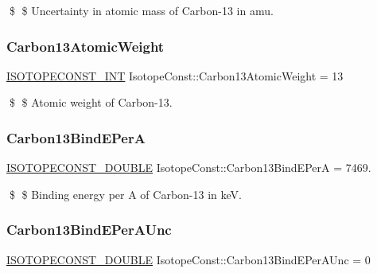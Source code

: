 \$ \$ Uncertainty in atomic mass of Carbon-\/13 in amu. \mbox{\label{group___isotope_const-_carbon-_c13_gac14d76d55767d91128913edcf63fb947}} 
\subsubsection{\texorpdfstring{Carbon13\+Atomic\+Weight}{Carbon13AtomicWeight}}
{\footnotesize\ttfamily \mbox{\hyperlink{group___isotope_const-_macros_ga5f18360b3e99483a35c32d789e62621c}{I\+S\+O\+T\+O\+P\+E\+C\+O\+N\+S\+T\+\_\+\+I\+NT}} Isotope\+Const\+::\+Carbon13\+Atomic\+Weight = 13}

\$ \$ Atomic weight of Carbon-\/13. \mbox{\label{group___isotope_const-_carbon-_c13_gaf77808284501b17d7325ed89c210363d}} 
\subsubsection{\texorpdfstring{Carbon13\+Bind\+E\+PerA}{Carbon13BindEPerA}}
{\footnotesize\ttfamily \mbox{\hyperlink{group___isotope_const-_macros_ga8f45a7272ce02c0b4c65c44636ed719a}{I\+S\+O\+T\+O\+P\+E\+C\+O\+N\+S\+T\+\_\+\+D\+O\+U\+B\+LE}} Isotope\+Const\+::\+Carbon13\+Bind\+E\+PerA = 7469.}

\$ \$ Binding energy per A of Carbon-\/13 in keV. \mbox{\label{group___isotope_const-_carbon-_c13_ga95d33cc96a0c48bdbf17601012fe45cb}} 
\subsubsection{\texorpdfstring{Carbon13\+Bind\+E\+Per\+A\+Unc}{Carbon13BindEPerAUnc}}
{\footnotesize\ttfamily \mbox{\hyperlink{group___isotope_const-_macros_ga8f45a7272ce02c0b4c65c44636ed719a}{I\+S\+O\+T\+O\+P\+E\+C\+O\+N\+S\+T\+\_\+\+D\+O\+U\+B\+LE}} Isotope\+Const\+::\+Carbon13\+Bind\+E\+Per\+A\+Unc = 0}

